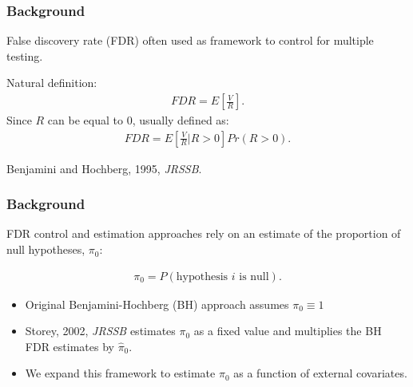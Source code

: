 \documentclass{beamer}
\begin{document}

\begin{frame}
\frametitle{Background}

{\color{red}False discovery rate (FDR)} often used as framework to control for multiple testing.\vspace{0.5cm}

Natural definition:
\begin{eqnarray*}
FDR = E \left [  \frac{V}{R}  \right ].
\end{eqnarray*}
Since $R$ can be equal to $0$, usually defined as:
\begin{eqnarray*}
\label{eq:fdr}
FDR = E \left [  \frac{V}{R} \bigg| R > 0 \right ] Pr(R > 0).
\end{eqnarray*}

\small Benjamini and Hochberg, 1995, \textit{JRSSB}.


\end{frame}


\begin{frame}
\frametitle{Background}

FDR control and estimation approaches rely on an estimate of the proportion of null hypotheses, $\pi_0$:

\begin{eqnarray*}
\pi_0 = P(\mbox{hypothesis $i$ is null}).
\end{eqnarray*}

\begin{itemize}
\item Original Benjamini-Hochberg (BH) approach assumes $\pi_0 \equiv 1$
\item Storey, 2002, \textit{JRSSB} estimates $\pi_0$ as a fixed value and multiplies the BH FDR estimates by $\hat{\pi}_0$.
\item We expand this framework to estimate $\pi_0$ as a function of external covariates.
\end{itemize}


\end{frame}

\end{document}
